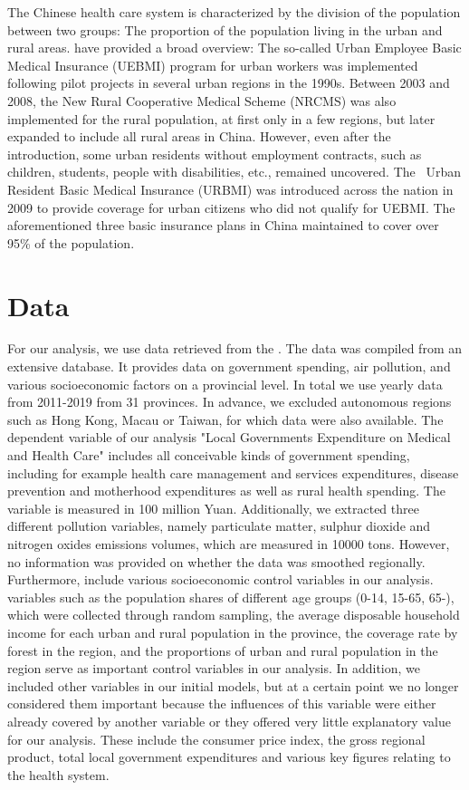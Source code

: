 \documentclass[
]{article}
\begin{document}
	The Chinese health care system is characterized by the division of the population between two groups: The proportion of the population living in the urban and rural areas.
	\cite{shi_health_2018} have provided a broad overview: The so-called Urban Employee Basic Medical Insurance (UEBMI) program for urban workers was implemented following pilot projects in several urban regions in the 1990s.
	Between 2003 and 2008, the New Rural Cooperative Medical Scheme (NRCMS) was also implemented for the rural population, at first only in a few regions, but later expanded to include all rural areas in China.
	However, even after the introduction, some urban residents without employment contracts, such as children, students, people with disabilities, etc., remained uncovered. The  Urban Resident Basic Medical Insurance (URBMI) was introduced across the nation in 2009 to provide coverage for urban citizens who did not qualify for UEBMI.
	The aforementioned three basic insurance plans in China maintained to cover over 95\% of the population.

	
	\section{Data} \label{Data}
	
	For our analysis, we use data retrieved from the \cite{NBSChina}. The data was compiled from an extensive database. It provides data on government spending, air pollution, and various socioeconomic factors on a provincial level. In total we use yearly data from 2011-2019 from 31 provinces. In advance, we excluded autonomous regions such as Hong Kong, Macau or Taiwan, for which data were also available. The dependent variable of our analysis "Local Governments Expenditure on Medical and Health Care" includes all conceivable kinds of government spending, including for example health care management and services expenditures, disease prevention and motherhood expenditures as well as rural health spending. The variable is measured in 100 million Yuan. Additionally, we extracted three different pollution variables, namely particulate matter, sulphur dioxide and nitrogen oxides emissions volumes, which are measured in 10000 tons. However, no information was provided on whether the data was smoothed regionally. Furthermore, include various socioeconomic control variables in our analysis. variables such as the population shares of different age groups (0-14, 15-65, 65-), which were collected through random sampling, the average disposable household income for each urban and rural population in the province, the coverage rate by forest in the region, and the proportions of urban and rural population in the region serve as important control variables in our analysis. 
	In addition, we included other variables in our initial models, but at a certain point we no longer considered them important because the influences of this variable were either already covered by another variable or they offered very little explanatory value for our analysis. These include the consumer price index, the gross regional product, total local government expenditures and various key figures relating to the health system.
	
\end{document}

